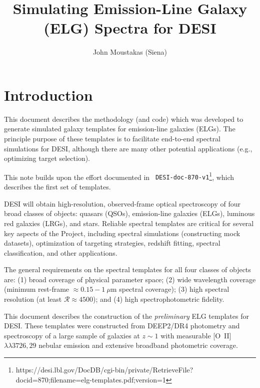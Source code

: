 \documentclass[12pt]{article}
\newcommand{\oiilam}{[O~II]~\ensuremath{\lambda\lambda3726,29}}
\begin{document}
\title{
  Simulating Emission-Line Galaxy (ELG) Spectra for DESI 
}

\author{John Moustakas (Siena)}
\maketitle


\section{Introduction}

This document describes the methodology (and code) which was developed
to generate simulated galaxy templates for emission-line galaxies
(ELGs).  The principle purpose of these templates is to facilitate
end-to-end spectral simulations for DESI, although there are many
other potential applications (e.g., optimizing target selection).

This note builds upon the effort documented in {\tt
  DESI-doc-870-v1}\footnote{https://desi.lbl.gov/DocDB/cgi-bin/private/RetrieveFile?docid=870;filename=elg-templates.pdf;version=1},
which describes the first set of templates.  



DESI will obtain high-resolution, observed-frame optical spectroscopy
of four broad classes of objects: quasars (QSOs), emission-line
galaxies (ELGs), luminous red galaxies (LRGs), and stars.  Reliable
spectral templates are critical for several key aspects of the
Project, including spectral simulations (constructing mock datasets),
optimization of targeting strategies, redshift fitting, spectral
classification, and other applications.

The general requirements on the spectral templates for all four
classes of objects are: (1) broad coverage of physical parameter
space; (2) wide wavelength coverage (minimum rest-frame
$\approx0.15-1~\mu$m spectral coverage); (3) high spectral
resolution (at least $\mathcal{R}\approx4500$); and (4) high
spectrophotometric fidelity.  

This document describes the construction of the \emph{preliminary} ELG
templates for DESI.  These templates were constructed from DEEP2/DR4
photometry and spectroscopy of a large sample of galaxies at $z\sim1$
with measurable \oiilam{} nebular emission and extensive broadband
photometric coverage.
\end{document}
